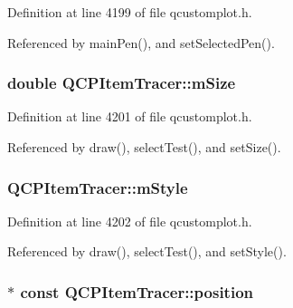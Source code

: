 Definition at line 4199 of file qcustomplot.\+h.



Referenced by main\+Pen(), and set\+Selected\+Pen().

\hypertarget{class_q_c_p_item_tracer_a575153a24bb357d1e006f6bc3bd099b9}{}
\subsubsection[{m\+Size}]{\setlength{\rightskip}{0pt plus 5cm}double Q\+C\+P\+Item\+Tracer\+::m\+Size\hspace{0.3cm}{\ttfamily [protected]}}\label{class_q_c_p_item_tracer_a575153a24bb357d1e006f6bc3bd099b9}


Definition at line 4201 of file qcustomplot.\+h.



Referenced by draw(), select\+Test(), and set\+Size().

\hypertarget{class_q_c_p_item_tracer_afb1f236bebf417544e0138fef22a292e}{}
\subsubsection[{m\+Style}]{ Q\+C\+P\+Item\+Tracer\+::m\+Style\hspace{0.3cm}{\ttfamily [protected]}}\label{class_q_c_p_item_tracer_afb1f236bebf417544e0138fef22a292e}


Definition at line 4202 of file qcustomplot.\+h.



Referenced by draw(), select\+Test(), and set\+Style().

\hypertarget{class_q_c_p_item_tracer_a69917e2fdb2b3a929c196958feee7cbe}{}
\subsubsection[{position}]{$\ast$ const Q\+C\+P\+Item\+Tracer\+::position}\label{class_q_c_p_item_tracer_a69917e2fdb2b3a929c196958feee7cbe}


